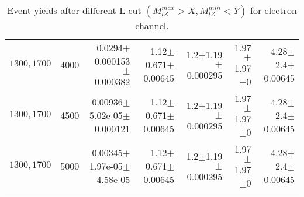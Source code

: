 \documentclass[]{article}
\begin{document}
\begin{table}
\begin{center}
{\begin{tabular}{ |r|r|r|r|r|r|r|}
$1300, 1700$ & 4000 & 0.0294$\pm$0.000153$\pm$0.000382 & 1.12$\pm$0.671$\pm$0.00645 & 1.2$\pm$1.19$\pm$0.000295 & 1.97$\pm$1.97$\pm$0 & 4.28$\pm$2.4$\pm$0.00645 \\
$1300, 1700$ & 4500 & 0.00936$\pm$5.02e-05$\pm$0.000121 & 1.12$\pm$0.671$\pm$0.00645 & 1.2$\pm$1.19$\pm$0.000295 & 1.97$\pm$1.97$\pm$0 & 4.28$\pm$2.4$\pm$0.00645 \\
$1300, 1700$ & 5000 & 0.00345$\pm$1.97e-05$\pm$4.58e-05 & 1.12$\pm$0.671$\pm$0.00645 & 1.2$\pm$1.19$\pm$0.000295 & 1.97$\pm$1.97$\pm$0 & 4.28$\pm$2.4$\pm$0.00645 \\
\hline 
\end{tabular}
}
\end{center}
\caption{Event yields after different L-cut $(M_{lZ}^{max} > X, M_{lZ}^{min} < Y)$ for electron channel.}
\end{table}
\end{document}
